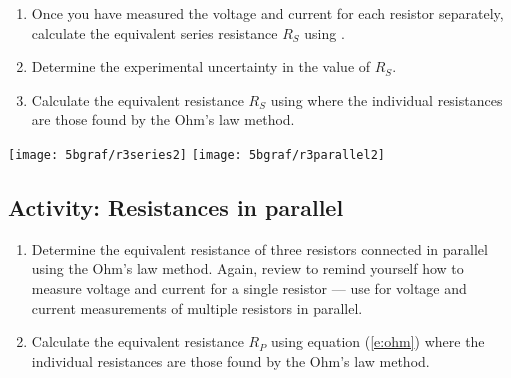 \begin{multicols}{2}
\begin{enumerate}
	\item Once you have measured the voltage and current for each resistor separately, calculate the equivalent series resistance $R_S$ using .
	
	\item Determine the experimental uncertainty in the value of $R_S$. %
	
	\item Calculate the equivalent resistance $R_S$ using  where the individual resistances are those found by the Ohm's law method. %
\end{enumerate}



\begin{center}
   {\texttt{[image: 5bgraf/r3series2]}
   \label{f:r3series}} %
 \vfill
   {\texttt{[image: 5bgraf/r3parallel2]}
   \label{f:r3par}} %
 \label{f:serpar}
\end{center}


\subsection{Activity: Resistances in parallel}
\begin{enumerate}
	\item Determine the equivalent resistance of three resistors connected in parallel using the Ohm's law method.  Again, review  to remind yourself how to measure voltage and current for a single resistor --- use  for voltage and current measurements of multiple resistors in parallel.
	
	\item Calculate the equivalent resistance $R_P$ using equation (\ref{e:ohm}) where the individual resistances are those found by the Ohm's law method.


\end{enumerate}
\end{multicols}

